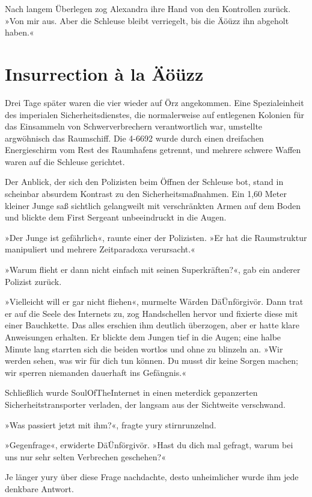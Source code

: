 Nach langem Überlegen zog Alexandra ihre Hand von den Kontrollen zurück. »Von mir aus. Aber die Schleuse bleibt verriegelt, bis die Äöüzz ihn abgeholt haben.«


\chapter{Insurrection à la Äöüzz}

Drei Tage später waren die vier wieder auf Örz angekommen. Eine Spezialeinheit des imperialen Sicherheitsdienstes, die normalerweise auf entlegenen Kolonien für das Einsammeln von Schwerverbrechern verantwortlich war, umstellte argwöhnisch das Raumschiff. Die 4-6692 wurde durch einen dreifachen Energieschirm vom Rest des Raumhafens getrennt, und mehrere schwere Waffen waren auf die Schleuse gerichtet.

Der Anblick, der sich den Polizisten beim Öffnen der Schleuse bot, stand in scheinbar absurdem Kontrast zu den Sicherheitsmaßnahmen. Ein 1,60 Meter kleiner Junge saß sichtlich gelangweilt mit verschränkten Armen auf dem Boden und blickte dem First Sergeant unbeeindruckt in die Augen.

»Der Junge ist gefährlich«, raunte einer der Polizisten. »Er hat die Raumstruktur manipuliert und mehrere Zeitparadoxa verursacht.«

»Warum flieht er dann nicht einfach mit seinen Superkräften?«, gab ein anderer Polizist zurück.

»Vielleicht will er gar nicht fliehen«, murmelte Wärden DäÜnförgivör. Dann trat er auf die Seele des Internets zu, zog Handschellen hervor und fixierte diese mit einer Bauchkette. Das alles erschien ihm deutlich überzogen, aber er hatte klare Anweisungen erhalten. Er blickte dem Jungen tief in die Augen; eine halbe Minute lang starrten sich die beiden wortlos und ohne zu blinzeln an. »Wir werden sehen, was wir für dich tun können. Du musst dir keine Sorgen machen; wir sperren niemanden dauerhaft ins Gefängnis.«

Schließlich wurde SoulOfTheInternet in einen meterdick gepanzerten Sicherheitstransporter verladen, der langsam aus der Sichtweite verschwand.

»Was passiert jetzt mit ihm?«, fragte yury stirnrunzelnd.

»Gegenfrage«, erwiderte DäÜnförgivör. »Hast du dich mal gefragt, warum bei uns nur sehr selten Verbrechen geschehen?«

Je länger yury über diese Frage nachdachte, desto unheimlicher wurde ihm jede denkbare Antwort.

